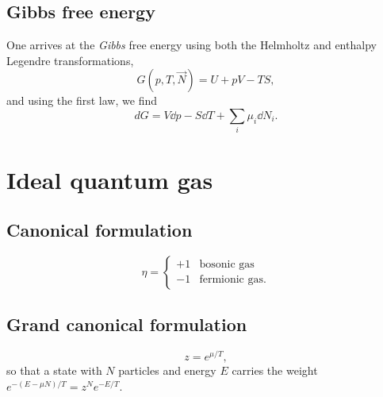 \subsection{Gibbs free energy}

One arrives at the {\it Gibbs} free energy using both the Helmholtz and enthalpy
Legendre transformations,
\begin{equation}
G(p,T,\vec{N})=U+pV-TS,
\end{equation}
and using the first law, we find
\begin{equation}
dG=V\dd{p}-S\dd{T}+\sum_i\mu_i\dd{N}_i.
\end{equation}


\section{Ideal quantum gas}

\subsection{Canonical formulation}

\begin{equation}
\eta=
  \begin{cases}
     +1 & \text{bosonic gas} \\
     -1 & \text{fermionic gas}.
  \end{cases}
\end{equation}

\subsection{Grand canonical formulation}

\begin{equation}\label{eq:fugacity}
  z=e^{\mu/T},
\end{equation}
so that a state with $N$ particles and energy $E$ carries the weight
$e^{-(E-\mu N)/T}=z^Ne^{-E/T}$.

